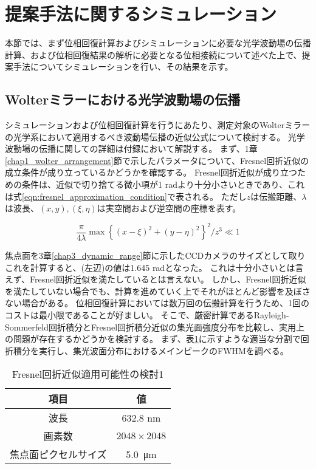 \section{提案手法に関するシミュレーション}
\label{chap3_transverse_simulation}

本節では、まず位相回復計算およびシミュレーションに必要な光学波動場の伝播計算、および位相回復結果の解析に必要となる位相接続について述べた上で、提案手法についてシミュレーションを行い、その結果を示す。

\subsection{Wolterミラーにおける光学波動場の伝播}
\label{chap3_wolter_diffraction_apporoximation}
シミュレーションおよび位相回復計算を行うにあたり、測定対象のWolterミラーの光学系において適用するべき波動場伝播の近似公式について検討する。
光学波動場の伝播に関しての詳細は付録において解説する。
まず、1章\ref{chap1_wolter_arrangement}節で示したパラメータについて、Fresnel回折近似の成立条件が成り立っているかどうかを確認する。
Fresnel回折近似が成り立つための条件は、近似で切り捨てる微小項が1 radより十分小さいときであり、これは式\ref{eqn:fresnel_approximation_condition}で表される。
ただし$z$は伝搬距離、$\lambda$は波長、$(x, y), (\xi, \eta)$は実空間および逆空間の座標を表す。

\begin{equation}
\label{eqn:fresnel_approximation_condition}
    \frac{\pi}{4\lambda} \max \left\{ (x-\xi)^2 + (y-\eta)^2 \right\}^2 / z^3 \ll 1
\end{equation}

焦点面を3章\ref{chap3_dynamic_range}節に示したCCDカメラのサイズとして取りこれを計算すると、(左辺)の値は1.645 radとなった。
これは十分小さいとは言えず、Fresnel回折近似を満たしているとは言えない。
しかし、Fresnel回折近似を満たしていない場合でも、計算を進めていく上でそれがほとんど影響を及ぼさない場合がある。
位相回復計算においては数万回の伝搬計算を行うため、1回のコストは最小限であることが好ましい。
そこで、厳密計算であるRayleigh-Sommerfeld回折積分とFresnel回折積分近似の集光面強度分布を比較し、実用上の問題が存在するかどうかを検討する。
まず、表\ref{tb:check_approximation_validity_1}に示すような適当な分割で回折積分を実行し、集光波面分布におけるメインピークのFWHMを調べる。

\begin{table}[!ht]
\begin{center}
  \caption{Fresnel回折近似適用可能性の検討1}
  \begin{tabular}{|c|c|} \hline
    項目 & 値 \\ \hline
    波長 & 632.8 nm \\
    画素数 & $2048 \times 2048$ \\
    焦点面ピクセルサイズ & \SI{5.0}{\micro \metre} \\ \hline
  \end{tabular}
  \label{tb:check_approximation_validity_1}
\end{center}
\end{table}

